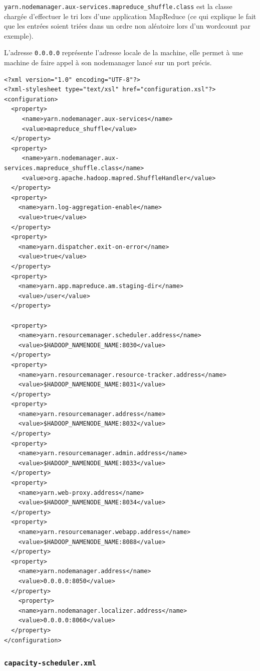 \par \texttt{yarn.nodemanager.aux-services.mapreduce\_shuffle.class} est la classe chargée d'effectuer le tri lors d'une application MapReduce (ce qui explique le fait que les entrées soient triées dans un ordre non aléatoire lors d'un wordcount par exemple).

\par L'adresse \texttt{0.0.0.0} représente l'adresse locale de la machine, elle permet à une machine de faire appel à son nodemanager lancé sur un port précis.

\begin{verbatim}
<?xml version="1.0" encoding="UTF-8"?>
<?xml-stylesheet type="text/xsl" href="configuration.xsl"?>
<configuration>
  <property>
     <name>yarn.nodemanager.aux-services</name>
     <value>mapreduce_shuffle</value>
  </property>
  <property>
     <name>yarn.nodemanager.aux-services.mapreduce_shuffle.class</name>
     <value>org.apache.hadoop.mapred.ShuffleHandler</value>
  </property>
  <property>
    <name>yarn.log-aggregation-enable</name>
    <value>true</value>
  </property>
  <property>
    <name>yarn.dispatcher.exit-on-error</name>
    <value>true</value>
  </property>
  <property>
    <name>yarn.app.mapreduce.am.staging-dir</name>
    <value>/user</value>
  </property>

  <property>
    <name>yarn.resourcemanager.scheduler.address</name>
    <value>$HADOOP_NAMENODE_NAME:8030</value>
  </property>
  <property>
    <name>yarn.resourcemanager.resource-tracker.address</name>
    <value>$HADOOP_NAMENODE_NAME:8031</value>
  </property>
  <property>
    <name>yarn.resourcemanager.address</name>
    <value>$HADOOP_NAMENODE_NAME:8032</value>
  </property>
  <property>
    <name>yarn.resourcemanager.admin.address</name>
    <value>$HADOOP_NAMENODE_NAME:8033</value>
  </property>
  <property>
    <name>yarn.web-proxy.address</name>
    <value>$HADOOP_NAMENODE_NAME:8034</value>
  </property>
  <property>
    <name>yarn.resourcemanager.webapp.address</name>
    <value>$HADOOP_NAMENODE_NAME:8088</value>
  </property>
  <property>
    <name>yarn.nodemanager.address</name>
    <value>0.0.0.0:8050</value>
  </property>
    <property>
    <name>yarn.nodemanager.localizer.address</name>
    <value>0.0.0.0:8060</value>
  </property>
</configuration>
\end{verbatim}

\subsubsection{\texttt{capacity-scheduler.xml}}
\label{sec:capac-sched-site.xml}

